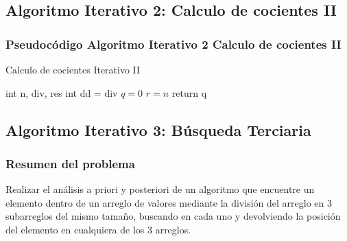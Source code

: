 \newpage
    \subsection{Algoritmo Iterativo 2: Calculo de cocientes II}
        
    \subsubsection{Pseudocódigo Algoritmo Iterativo 2 Calculo de cocientes II}
        \begin{algorithm}
            \caption{Calculo de cocientes Iterativo II 
            }\label{alg:two}
            int n, div, res \;
            int dd = div \;
            $q = 0$\;
            $r = n$\;
            return q\;
            
           
        \end{algorithm}     

\newpage

    \subsection{Algoritmo Iterativo 3: Búsqueda Terciaria  }
    \subsubsection{Resumen del problema}
        Realizar el análisis a priori y posteriori de un algoritmo que encuentre un elemento dentro de un arreglo de valores mediante la división del arreglo en 3 subarreglos del mismo tamaño, buscando en cada uno y devolviendo la posición del elemento en cualquiera de los 3 arreglos.
        

